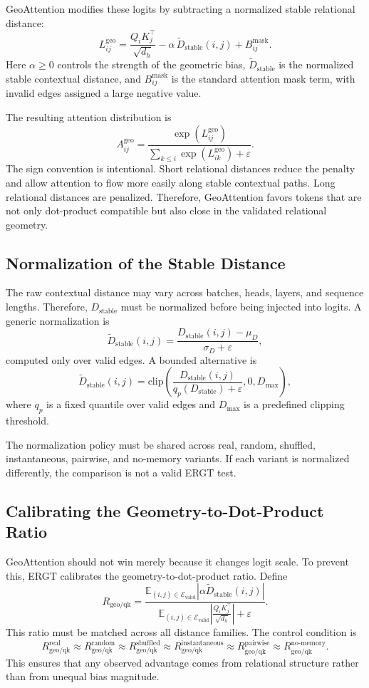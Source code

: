 \documentclass[11pt]{article}
\begin{document}
GeoAttention modifies these logits by subtracting a normalized stable relational distance:
\[
L_{ij}^{\mathrm{geo}}
=
\frac{Q_iK_j^\top}{\sqrt{d_h}}
-
\alpha\,\widetilde{D}_{\mathrm{stable}}(i,j)
+
B_{ij}^{\mathrm{mask}}.
\]
Here $\alpha\geq 0$ controls the strength of the geometric bias, $\widetilde{D}_{\mathrm{stable}}$ is the normalized stable contextual distance, and $B_{ij}^{\mathrm{mask}}$ is the standard attention mask term, with invalid edges assigned a large negative value.

The resulting attention distribution is
\[
A_{ij}^{\mathrm{geo}}
=
\frac{
\exp(L_{ij}^{\mathrm{geo}})
}{
\sum_{k\leq i}\exp(L_{ik}^{\mathrm{geo}})+\varepsilon
}.
\]
The sign convention is intentional. Short relational distances reduce the penalty and allow attention to flow more easily along stable contextual paths. Long relational distances are penalized. Therefore, GeoAttention favors tokens that are not only dot-product compatible but also close in the validated relational geometry.

\subsection{Normalization of the Stable Distance}

The raw contextual distance may vary across batches, heads, layers, and sequence lengths. Therefore, $D_{\mathrm{stable}}$ must be normalized before being injected into logits. A generic normalization is
\[
\widetilde{D}_{\mathrm{stable}}(i,j)
=
\frac{D_{\mathrm{stable}}(i,j)-\mu_D}{\sigma_D+\varepsilon},
\]
computed only over valid edges. A bounded alternative is
\[
\widetilde{D}_{\mathrm{stable}}(i,j)
=
\mathrm{clip}
\left(
\frac{D_{\mathrm{stable}}(i,j)}{q_p(D_{\mathrm{stable}})+\varepsilon},
0,
D_{\max}
\right),
\]
where $q_p$ is a fixed quantile over valid edges and $D_{\max}$ is a predefined clipping threshold.

The normalization policy must be shared across real, random, shuffled, instantaneous, pairwise, and no-memory variants. If each variant is normalized differently, the comparison is not a valid ERGT test.

\subsection{Calibrating the Geometry-to-Dot-Product Ratio}

GeoAttention should not win merely because it changes logit scale. To prevent this, ERGT calibrates the geometry-to-dot-product ratio. Define
\[
R_{\mathrm{geo/qk}}
=
\frac{
\mathbb{E}_{(i,j)\in\mathcal{E}_{\mathrm{valid}}}
|\alpha\widetilde{D}_{\mathrm{stable}}(i,j)|
}{
\mathbb{E}_{(i,j)\in\mathcal{E}_{\mathrm{valid}}}
\left|\frac{Q_iK_j^\top}{\sqrt{d_h}}\right|+
\varepsilon
}.
\]
This ratio must be matched across all distance families. The control condition is
\[
R_{\mathrm{geo/qk}}^{\mathrm{real}}
\approx
R_{\mathrm{geo/qk}}^{\mathrm{random}}
\approx
R_{\mathrm{geo/qk}}^{\mathrm{shuffled}}
\approx
R_{\mathrm{geo/qk}}^{\mathrm{instantaneous}}
\approx
R_{\mathrm{geo/qk}}^{\mathrm{pairwise}}
\approx
R_{\mathrm{geo/qk}}^{\mathrm{no\text{-}memory}}.
\]
This ensures that any observed advantage comes from relational structure rather than from unequal bias magnitude.
\end{document}

